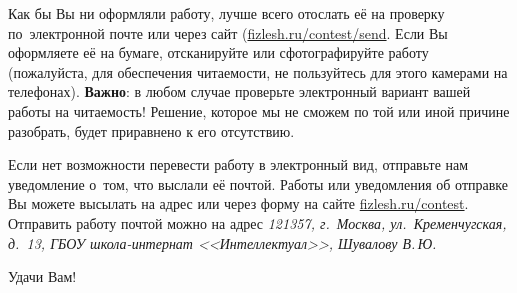 \documentclass[a4paper,12pt]{article}
\begin{document}
Как бы Вы ни оформляли работу, лучше всего отослать её на проверку по~электронной
почте или через сайт (\href{http://fizlesh.ru/contest/send}{fizlesh.ru/contest/send}.
Если Вы оформляете её на бумаге, отсканируйте или сфотографируйте работу
(пожалуйста, для обеспечения читаемости, не пользуйтесь для этого камерами на телефонах).
\textbf{Важно}: в любом случае проверьте электронный вариант вашей работы на читаемость!
Решение, которое мы не сможем по той или иной причине разобрать, будет приравнено к его отсутствию.

Если нет возможности перевести работу в электронный вид, отправьте нам уведомление
о~том, что выслали её почтой. Работы или уведомления об отправке Вы можете высылать
на адрес \href{mailto:\olympmail}{\olympmail}
или через форму на сайте \href{http://fizlesh.ru/contest}{fizlesh.ru/contest}.
Отправить работу почтой можно на адрес \emph{121357, г.~Москва, ул.~Кременчугская, д.~13, ГБОУ школа-интернат
<<Интеллектуал>>, Шувалову В.\,Ю.}

\vfill

Удачи Вам!
\end{document}
